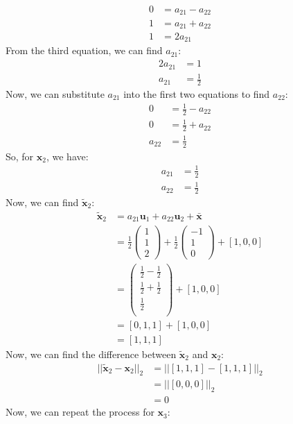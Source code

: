\documentclass[a3paper,12pt]{extarticle} %
\begin{document}
\begin{enumerate}
\begin{align}
0 &= a_{21} - a_{22}\\
1 &= a_{21} + a_{22}\\
1 &= 2a_{21}
\end{align}
From the third equation, we can find $a_{21}$:
\begin{align}
2a_{21} &= 1\\
a_{21} &= \frac{1}{2}
\end{align}
Now, we can substitute $a_{21}$ into the first two equations to find $a_{22}$:
\begin{align}
0 &= \frac{1}{2} - a_{22}\\
0 &= \frac{1}{2} + a_{22}\\
a_{22} &= \frac{1}{2}
\end{align}
So, for $\mathbf{x}_2$, we have:
\begin{align}
a_{21} &= \frac{1}{2}\\
a_{22} &= \frac{1}{2}
\end{align}
Now, we can find $\tilde{\mathbf{x}}_2$:
\begin{align}
\tilde{\mathbf{x}}_2 &= a_{21}\mathbf{u}_1 + a_{22}\mathbf{u}_2 + \bar{\mathbf{x}}\\
&= \frac{1}{2}\begin{pmatrix}
1\\
1\\
2
\end{pmatrix} + \frac{1}{2}\begin{pmatrix}
-1\\
1\\
0
\end{pmatrix} + [1, 0, 0]\\
&= \begin{pmatrix}
\frac{1}{2} - \frac{1}{2}\\
\frac{1}{2} + \frac{1}{2}\\
\frac{1}{2}\\
\end{pmatrix} + [1, 0, 0]\\
&= [0, 1, 1] + [1, 0, 0]\\
&= [1, 1, 1]
\end{align}
Now, we can find the difference between $\tilde{\mathbf{x}}_2$ and $\mathbf{x}_2$:
\begin{align}
||\tilde{\mathbf{x}}_2 - \mathbf{x}_2||_2 &= ||[1, 1, 1] - [1, 1, 1]||_2\\
&= ||[0, 0, 0]||_2\\
&= 0
\end{align}
Now, we can repeat the process for $\mathbf{x}_3$:

\end{enumerate}
\end{document}
